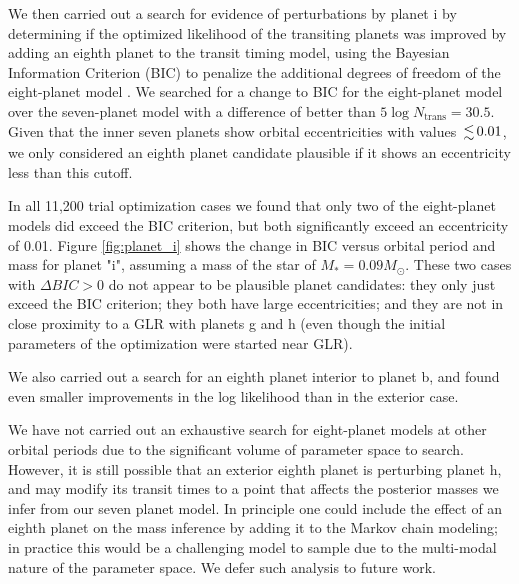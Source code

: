 \documentclass[fleqn,usenatbib]{mnras} %
\begin{document}
We then carried out a search for evidence of perturbations by planet i by
determining if the optimized likelihood of the transiting planets was improved
by adding an eighth planet to the transit timing model, using
the Bayesian Information Criterion (BIC) to penalize the additional degrees
of freedom of the eight-planet model \citep{Wit2012}.  We searched for a change 
to BIC for the eight-planet model over the seven-planet model with a difference
of better than $5\log{N_\mathrm{trans}} = 30.5$.  Given that the inner seven
planets show orbital eccentricities with values $\la 0.01$, we only considered
an eighth planet candidate plausible if it shows an eccentricity less than
this cutoff.

In all 11,200 trial optimization cases we found that only two of the eight-planet models 
did exceed the BIC criterion, but both significantly exceed an eccentricity
of 0.01.  Figure  \ref{fig:planet_i} shows the change in BIC versus
orbital period and mass for planet "i", assuming a mass of the star
of $M_* = 0.09 M_\odot$.   These two cases with $\Delta BIC {>} 0$
do not appear to be plausible
planet candidates:  they only just exceed the BIC criterion;  they
both have large eccentricities; and they are not in close proximity to a
GLR with planets g and h (even though the initial parameters of the optimization were started near GLR).

We also carried out a search for an eighth planet interior to planet
b, and found even smaller improvements in the log likelihood than
in the exterior case.

We have not carried out an exhaustive search for eight-planet models
at other orbital periods due to the significant volume of parameter
space to search.   However, it is still possible that an exterior
eighth planet is perturbing planet h, and may modify its transit
times to a point that affects the posterior masses we infer from
our seven planet model.   In principle one could include the effect
of an eighth planet on the mass inference by adding it to the Markov
chain modeling;  in practice this would be a challenging model to
sample due to the multi-modal nature of the parameter space.
We defer such analysis to future work.
\end{document}
